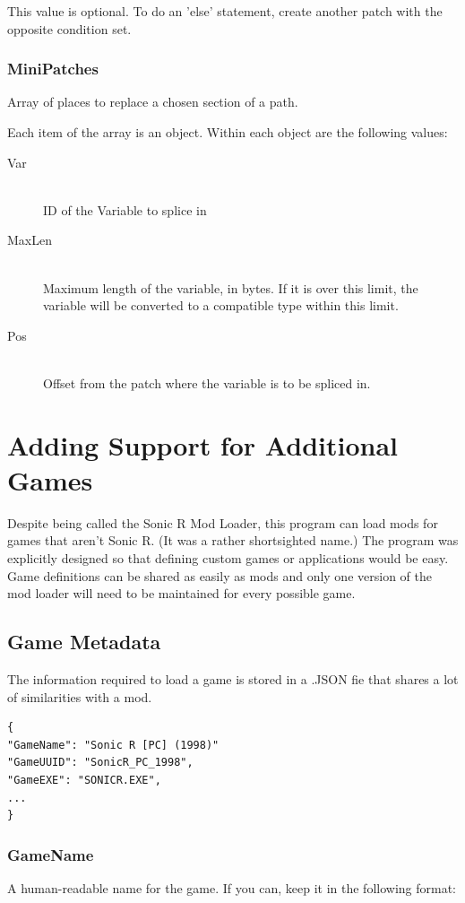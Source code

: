 \documentclass[12pt,a4paper,notitlepage]{article}
\begin{document}
This value is optional. To do an 'else' statement, create another patch with the opposite condition set.

\subsubsection{MiniPatches}
Array of places to replace a chosen section of a path.

Each item of the array is an object. Within each object are the following values:
\begin{description}
\item[Var] \hfill \\ 
	ID of the Variable to splice in
\item[MaxLen] \hfill \\
	Maximum length of the variable, in bytes. If it is over this limit, the variable will be converted to a compatible type within this limit.
\item[Pos] \hfill \\
	Offset from the patch where the variable is to be spliced in.
\end{description}


\pagebreak
\section{Adding Support for Additional Games}
\label{sec:games}
Despite being called the Sonic R Mod Loader, this program can load mods for games that aren't Sonic R. (It was a rather shortsighted name.) The program was explicitly designed so that defining custom games or applications would be easy. Game definitions can be shared as easily as mods and only one version of the mod loader will need to be maintained for every possible game.

\subsection{Game Metadata}
\label{subsec:games-meta}
The information required to load a game is stored in a .JSON fie that shares a lot of similarities with a mod.

\begin{lstlisting}[breaklines=true]
{
"GameName": "Sonic R [PC] (1998)"
"GameUUID": "SonicR_PC_1998",
"GameEXE": "SONICR.EXE",
...
}
\end{lstlisting}

\subsubsection{GameName}
A human-readable name for the game. If you can, keep it in the following format:
\end{document}
